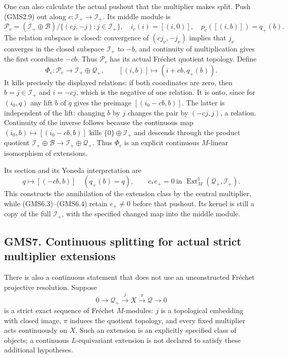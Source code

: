 One can also calculate the actual pushout that the multiplier makes
split. Push (GMS2.9) out along \(c:\mathcal I_+\to\mathcal I_+\). Its
middle module is \[
\mathcal P_c=(\mathcal I_+\oplus\mathcal B)/
\{(cj,-j):j\in\mathcal I_+\},
\quad i_c(i)=[(i,0)],\quad p_c([(i,b)])=q_+(b).
\tag{GMS6.5}
\] The relation subspace is closed: convergence of \((cj_\nu,-j_\nu)\)
implies that \(j_\nu\) converges in the closed subspace \(\mathcal I_+\)
to \(-b\), and continuity of multiplication gives the first coordinate
\(-cb\). Thus \(\mathcal P_c\) has its actual Fréchet quotient topology.
Define \[
\Phi_c:\mathcal P_c\longrightarrow\mathcal I_+\oplus\mathcal Q_+,
\qquad [(i,b)]\longmapsto(i+cb,q_+(b)).
\tag{GMS6.6}
\] It kills precisely the displayed relations: if both coordinates are
zero, then \(b=j\in\mathcal I_+\) and \(i=-cj\), which is the negative
of one relation. It is onto, since for \((i_0,q)\) any lift \(b\) of
\(q\) gives the preimage \([(i_0-cb,b)]\). The latter is independent of
the lift: changing \(b\) by \(j\) changes the pair by \((-cj,j)\), a
relation. Continuity of the inverse follows because the continuous map
\((i_0,b)\mapsto[(i_0-cb,b)]\) kills \(\{0\}\oplus\mathcal I_+\) and
descends through the product quotient
\(\mathcal I_+\oplus\mathcal B\to\mathcal I_+\oplus\mathcal Q_+\). Thus
\(\Phi_c\) is an explicit continuous \(M\)-linear isomorphism of
extensions.

Its section and its Yoneda interpretation are \[
q\longmapsto[(-cb,b)]\quad(q_+(b)=q),\qquad
c_*e_+=0\ \text{in }\operatorname{Ext}^1_M(\mathcal Q_+,\mathcal I_+).
\tag{GMS6.7}
\] This constructs the annihilation of the extension class by the
central multiplier, while (GMS6.3)--(GMS6.4) retain \(e_+\ne0\) before
that pushout. Its kernel is still a copy of the full \(\mathcal I_+\),
with the specified changed map into the middle module.

\subsection{GMS7. Continuous splitting for actual strict multiplier
extensions}\label{gms7.-continuous-splitting-for-actual-strict-multiplier-extensions}

There is also a continuous statement that does not use an unconstructed
Fréchet projective resolution. Suppose \[
0\longrightarrow\mathcal Q_+\xrightarrow{j}X
\xrightarrow{\pi}\mathcal Q\longrightarrow0
\tag{GMS7.1}
\] is a strict exact sequence of Fréchet \(M\)-modules: \(j\) is a
topological embedding with closed image, \(\pi\) induces the quotient
topology, and every fixed multiplier acts continuously on \(X\). Such an
extension is an explicitly specified class of objects; a continuous
\(L\)-equivariant extension is not declared to satisfy these additional
hypotheses.

